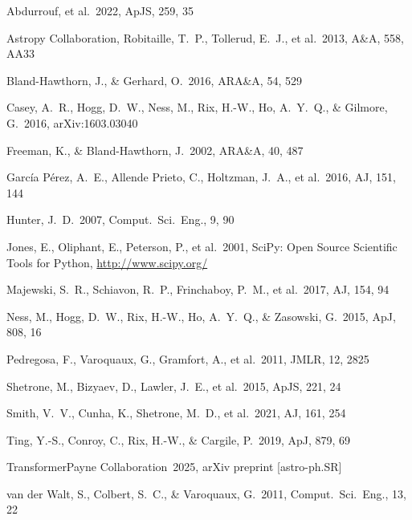 \documentclass[preprint]{aastex701-1/aastex701}
\begin{document}
\begin{thebibliography}{}

Abdurrouf, et al.\ 2022, ApJS, 259, 35

Astropy Collaboration, Robitaille, T.\ P., Tollerud, E.\ J., et al.\ 2013, A\&A, 558, AA33

Bland-Hawthorn, J., \& Gerhard, O.\ 2016, ARA\&A, 54, 529

Casey, A.\ R., Hogg, D.\ W., Ness, M., Rix, H.-W., Ho, A.\ Y.\ Q., \& Gilmore, G.\
2016, arXiv:1603.03040

Freeman, K., \& Bland-Hawthorn, J.\ 2002, ARA\&A, 40, 487

Garc\'ia P\'erez, A.\ E., Allende Prieto, C., Holtzman, J.\ A., et al.\ 2016,
AJ, 151, 144

Hunter, J.\ D.\ 2007, Comput.\ Sci.\ Eng., 9, 90

Jones, E., Oliphant, E., Peterson, P., et al.\ 2001, SciPy: Open Source Scientific
Tools for Python, \url{http://www.scipy.org/}

Majewski, S.\ R., Schiavon, R.\ P., Frinchaboy, P.\ M., et al.\ 2017, AJ, 154, 94

Ness, M., Hogg, D.\ W., Rix, H.-W., Ho, A.\ Y.\ Q., \& Zasowski, G.\ 2015,
ApJ, 808, 16

Pedregosa, F., Varoquaux, G., Gramfort, A., et al.\ 2011, JMLR, 12, 2825

Shetrone, M., Bizyaev, D., Lawler, J.\ E., et al.\ 2015, ApJS, 221, 24

Smith, V.\ V., Cunha, K., Shetrone, M.\ D., et al.\ 2021, AJ, 161, 254

Ting, Y.-S., Conroy, C., Rix, H.-W., \& Cargile, P.\ 2019, ApJ, 879, 69

TransformerPayne Collaboration\ 2025, arXiv preprint [astro-ph.SR]

van der Walt, S., Colbert, S.\ C., \& Varoquaux, G.\ 2011, Comput.\ Sci.\ Eng., 13, 22

\end{thebibliography}
\end{document}
